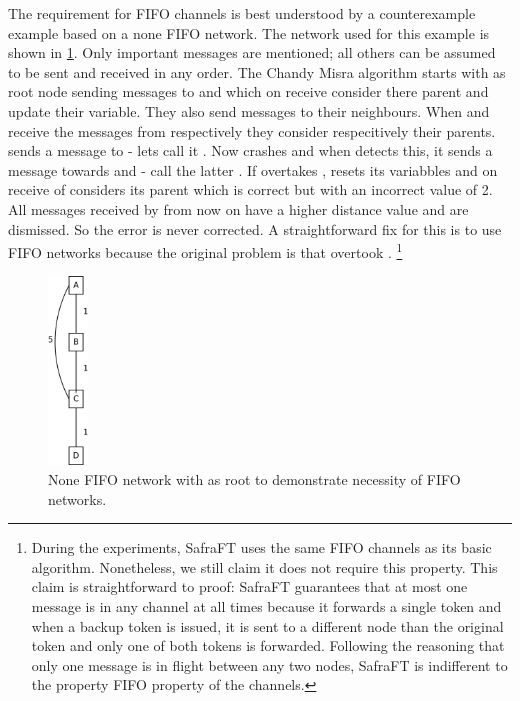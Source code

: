 The requirement for FIFO channels is best understood by a counterexample example based on a none FIFO network.
The network used for this example is shown in \cref{fig:fifoNecessaryNetwork}.
Only important messages are mentioned; all others can be assumed to be sent and received in any order.
The Chandy Misra algorithm starts with  as root node sending  messages to  and  which on receive consider  there parent and update their  variable.
They also send  messages to their neighbours.
When  and  receive the  messages from  respectively  they consider  respecitively  their parents.
 sends a  message to  - lets call it .
Now  crashes and when  detects this, it sends a  message towards  and  - call the latter .
If  overtakes ,  resets its variabbles and on receive of  considers  its parent which is correct but with an incorrect  value of 2.
All  messages received by  from now on have a higher distance value and are dismissed.
So the error is never corrected.
A straightforward fix for this is to use FIFO networks because the original problem is that  overtook .
\footnote{During the experiments, SafraFT uses the same FIFO channels as its basic algorithm.
Nonetheless, we still claim it does not require this property.
This claim is straightforward to proof: SafraFT guarantees that at most one message is in any channel at all times because it forwards a single token and when a backup token is issued, it is sent to a different node than the original token and only one of both tokens is forwarded.
Following the reasoning that only one message is in flight between any two nodes, SafraFT is indifferent to the property FIFO property of the channels.}

\begin{figure}[h]
    \includegraphics[height=5cm]{figures/FIFO_necessary}
    \centering
    \caption{None FIFO network with  as root to demonstrate necessity of FIFO networks.}
    \label{fig:fifoNecessaryNetwork}
\end{figure}

